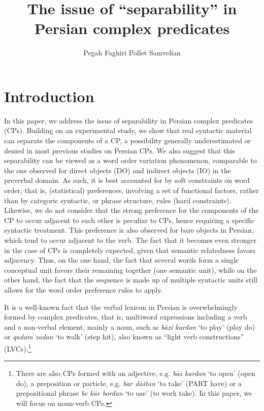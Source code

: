 \documentclass[output=paper]{langsci/langscibook}
\author{Pegah Faghiri\affiliation{Universiteit van Amsterdam} \lastand Pollet   Samvelian\affiliation{Université Sorbonne Nouvelle}}
\title{The issue of ``separability'' in Persian complex predicates}
\begin{document}
\maketitle

\section{Introduction}

\begin{sloppypar}
  In this paper, we address the issue of separability in Persian
  complex predicates (CPs). Building on an experimental study, we show
  that real syntactic material can separate the components of a CP, a
  possibility generally underestimated or denied in most previous
  studies on Persian CPs. We also suggest that this separability can
  be viewed as a word order variation phenomenon, comparable to the
  one observed for direct objects (DO) and indirect objects (IO) in
  the preverbal domain. As such, it is best accounted for by soft
  constraints on word order, that is, (statistical) preferences,
  involving a set of functional factors, rather than by categoric
  syntactic, or phrase structure, rules (hard constraints). Likewise,
  we do not consider that the strong preference for the components of
  the CP to occur adjacent to each other is peculiar to CPs, hence
  requiring a specific syntactic treatment. This preference is also
  observed for bare objects in Persian, which tend to occur adjacent
  to the verb. The fact that it becomes even stronger in the case of
  CPs is completely expected, given that semantic relatedness favors
  adjacency.  Thus, on the one hand, the fact that several words form
  a single conceptual unit favors their remaining together (one
  semantic unit), while on the other hand, the fact that the sequence
  is made up of multiple syntactic units still allows for the word
  order preference rules to apply.
\end{sloppypar}

It is a well-known fact that the verbal lexicon in Persian is overwhelmingly formed by complex predicates, that is, multiword expressions including a verb and a non-verbal element, mainly a noun, such as \textit{b\=azi kardan} `to play' (play do) or \textit{qadam zadan} `to walk' (step hit), also known as ``light verb constructions'' (LVCs).\footnote{There are also CPs formed with an adjective, e.g. \textit{b\=az kardan} `to open' (open do), a preposition or particle, e.g. \textit{bar d\=a\v{s}tan} `to take' (\textsc{PART} have) or a prepositional phrase \textit{be k\=ar bordan} `to use' (to work take). In this paper, we will focus on noun-verb CPs.}
\end{document}
